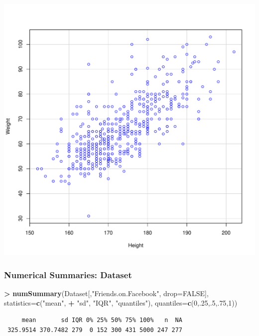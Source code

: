 \documentclass[
]{article}
\newenvironment{Shaded}{\begin{snugshade}}{\end{snugshade}}
\newcommand{\AttributeTok}[1]{\textcolor[rgb]{0.13,0.29,0.53}{#1}}
\newcommand{\ConstantTok}[1]{\textcolor[rgb]{0.56,0.35,0.01}{#1}}
\newcommand{\DecValTok}[1]{\textcolor[rgb]{0.00,0.00,0.81}{#1}}
\newcommand{\FunctionTok}[1]{\textcolor[rgb]{0.13,0.29,0.53}{\textbf{#1}}}
\newcommand{\NormalTok}[1]{#1}
\newcommand{\SpecialCharTok}[1]{\textcolor[rgb]{0.81,0.36,0.00}{\textbf{#1}}}
\newcommand{\StringTok}[1]{\textcolor[rgb]{0.31,0.60,0.02}{#1}}
\begin{document}
\includegraphics[width=750px]{RcmdrMarkdown_files/figure-latex/unnamed-chunk-25-1}

\subsubsection{Numerical Summaries:
Dataset}\label{numerical-summaries-dataset}

\begin{Shaded}
\begin{Highlighting}[]
\SpecialCharTok{\textgreater{}} \FunctionTok{numSummary}\NormalTok{(Dataset[,}\StringTok{"Friends.on.Facebook"}\NormalTok{, }\AttributeTok{drop=}\ConstantTok{FALSE}\NormalTok{], }\AttributeTok{statistics=}\FunctionTok{c}\NormalTok{(}\StringTok{"mean"}\NormalTok{,}
\SpecialCharTok{+}    \StringTok{"sd"}\NormalTok{, }\StringTok{"IQR"}\NormalTok{, }\StringTok{"quantiles"}\NormalTok{), }\AttributeTok{quantiles=}\FunctionTok{c}\NormalTok{(}\DecValTok{0}\NormalTok{,.}\DecValTok{25}\NormalTok{,.}\DecValTok{5}\NormalTok{,.}\DecValTok{75}\NormalTok{,}\DecValTok{1}\NormalTok{))}
\end{Highlighting}
\end{Shaded}

\begin{verbatim}
     mean       sd IQR 0% 25% 50% 75% 100%   n  NA
 325.9514 370.7482 279  0 152 300 431 5000 247 277
\end{verbatim}
\end{document}
